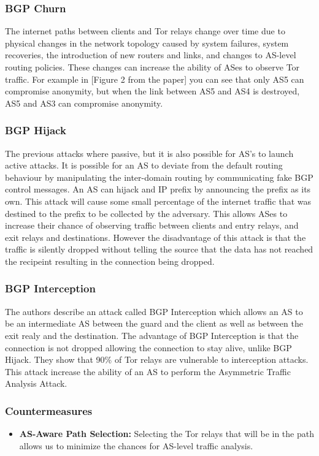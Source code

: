 \documentclass[9pt,technote]{IEEEtran}
\begin{document}
\subsubsection{BGP Churn}
The internet paths between clients and Tor relays change over time due to
physical changes in the network topology caused by system failures, system
recoveries, the introduction of new routers and links, and changes to AS-level
routing policies. These changes can increase the ability of ASes to observe Tor
traffic. For example in [Figure 2 from the paper] you can see that only AS5 can
compromise anonymity, but when the link between AS5 and AS4 is destroyed, AS5
and AS3 can compromise anonymity.
\subsubsection{BGP Hijack}
The previous attacks where passive, but it is also possible for AS's to launch
active attacks. It is possible for an AS to deviate from the default routing
behaviour by manipulating the inter-domain routing by communicating fake BGP
control messages. An AS can hijack and IP prefix by announcing the prefix as its
own. This attack will cause some small percentage of the internet traffic that
was destined to the prefix to be collected by the adversary. This allows ASes to
increase their chance of observing traffic between clients and entry relays, and
exit relays and destinations. However the disadvantage of this attack is that
the traffic is silently dropped without telling the source that the data has not
reached the recipeint resulting in the connection being dropped.
\subsubsection{BGP Interception}
The authors describe an attack called BGP Interception which allows an AS to be
an intermediate AS between the guard and the client as well as between the exit
realy and the destination. The advantage of BGP Interception is that the
connection is not dropped allowing the connection to stay alive, unlike BGP
Hijack. They show that 90\% of Tor relays are vulnerable to interception
attacks. This attack increase the ability of an AS to perform the Asymmetric
Traffic Analysis Attack. 
\subsubsection{Countermeasures}
\begin{itemize}
\item \textbf{AS-Aware Path Selection:} Selecting the Tor relays that will be in
	the path allows us to minimize the chances for AS-level traffic
	analysis.
\end{itemize}
\end{document}
